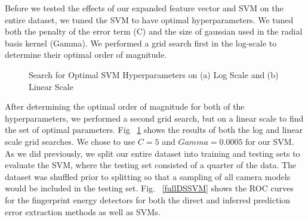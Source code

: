 Before we tested the effects of our expanded feature vector and SVM on the entire dataset, we tuned the SVM to have optimal hyperparameters. We tuned both the penalty of the error term (C) and the size of gaussian used in the radial basis kernel (Gamma). We performed a grid search first in the log-scale to determine their optimal order of magnitude.

\begin{figure}[htbp]%
  \centering
  \qquad
\caption{Search for Optimal SVM Hyperparameters on (a) Log Scale and (b) Linear Scale}%
\label{svmparameters}%
\end{figure}

After determining the optimal order of magnitude for both of the hyperparameters, we performed a second grid search, but on a linear scale to find the set of optimal parameters. Fig ~\ref{svmparameters} shows the results of both the log and linear scale grid searches. We chose to use $C = 5$ and $Gamma = 0.0005$ for our SVM. As we did previously, we split our entire dataset into training and testing sets to evaluate the SVM, where the testing set consisted of a quarter of the data. The dataset was shuffled prior to splitting so that a sampling of all camera models would be included in the testing set. Fig. ~\ref{fullDSSVM} shows the ROC curves for the fingerprint energy detectors for both the direct and inferred prediction error extraction methods as well as SVMs.

